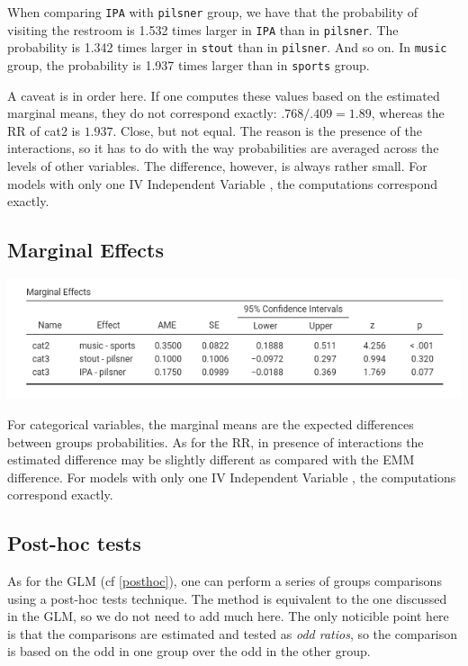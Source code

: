 \documentclass[
]{book}
\begin{document}
When comparing \texttt{IPA} with \texttt{pilsner} group, we have that the probability of visiting the restroom is 1.532 times larger in \texttt{IPA} than in \texttt{pilsner}. The probability is 1.342 times larger in \texttt{stout} than in \texttt{pilsner}. And so on. In \texttt{music} group, the probability is 1.937 times larger than in \texttt{sports} group.

A caveat is in order here. If one computes these values based on the estimated marginal means, they do not correspond exactly: \(.768/.409=1.89\), whereas the RR of cat2 is \(1.937\). Close, but not equal. The reason is the presence of the interactions, so it has to do with the way probabilities are averaged across the levels of other variables. The difference, however, is always rather small. For models with only one {IV {Independent Variable} }, the computations correspond exactly.

\hypertarget{logisticcatmarginal}{%
\subsection{Marginal Effects}\label{logisticcatmarginal}}

\includegraphics{bookletpics/3_logistic_output11.png}

For categorical variables, the marginal means are the expected differences between groups probabilities. As for the RR, in presence of interactions the estimated difference may be slightly different as compared with the EMM difference. For models with only one {IV {Independent Variable} }, the computations correspond exactly.

\hypertarget{post-hoc-tests}{%
\subsection{Post-hoc tests}\label{post-hoc-tests}}

As for the GLM (cf \ref{posthoc}), one can perform a series of groups comparisons using a post-hoc tests technique. The method is equivalent to the one discussed in the GLM, so we do not need to add much here. The only noticible point here is that the comparisons are estimated and tested as \emph{odd ratios}, so the comparison is based on the odd in one group over the odd in the other group.
\end{document}
